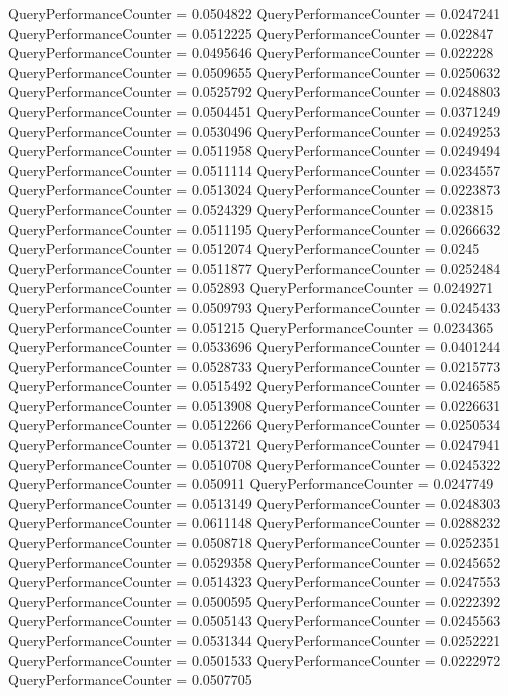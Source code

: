 \documentclass[9pt]{article}
\theoremstyle{plain}
\theoremstyle{definition}
\theoremstyle{remark}
\numberwithin{equation}{section}
\begin{document}
QueryPerformanceCounter  =  0.0504822
QueryPerformanceCounter  =  0.0247241
QueryPerformanceCounter  =  0.0512225
QueryPerformanceCounter  =  0.022847
QueryPerformanceCounter  =  0.0495646
QueryPerformanceCounter  =  0.022228
QueryPerformanceCounter  =  0.0509655
QueryPerformanceCounter  =  0.0250632
QueryPerformanceCounter  =  0.0525792
QueryPerformanceCounter  =  0.0248803
QueryPerformanceCounter  =  0.0504451
QueryPerformanceCounter  =  0.0371249
QueryPerformanceCounter  =  0.0530496
QueryPerformanceCounter  =  0.0249253
QueryPerformanceCounter  =  0.0511958
QueryPerformanceCounter  =  0.0249494
QueryPerformanceCounter  =  0.0511114
QueryPerformanceCounter  =  0.0234557
QueryPerformanceCounter  =  0.0513024
QueryPerformanceCounter  =  0.0223873
QueryPerformanceCounter  =  0.0524329
QueryPerformanceCounter  =  0.023815
QueryPerformanceCounter  =  0.0511195
QueryPerformanceCounter  =  0.0266632
QueryPerformanceCounter  =  0.0512074
QueryPerformanceCounter  =  0.0245
QueryPerformanceCounter  =  0.0511877
QueryPerformanceCounter  =  0.0252484
QueryPerformanceCounter  =  0.052893
QueryPerformanceCounter  =  0.0249271
QueryPerformanceCounter  =  0.0509793
QueryPerformanceCounter  =  0.0245433
QueryPerformanceCounter  =  0.051215
QueryPerformanceCounter  =  0.0234365
QueryPerformanceCounter  =  0.0533696
QueryPerformanceCounter  =  0.0401244
QueryPerformanceCounter  =  0.0528733
QueryPerformanceCounter  =  0.0215773
QueryPerformanceCounter  =  0.0515492
QueryPerformanceCounter  =  0.0246585
QueryPerformanceCounter  =  0.0513908
QueryPerformanceCounter  =  0.0226631
QueryPerformanceCounter  =  0.0512266
QueryPerformanceCounter  =  0.0250534
QueryPerformanceCounter  =  0.0513721
QueryPerformanceCounter  =  0.0247941
QueryPerformanceCounter  =  0.0510708
QueryPerformanceCounter  =  0.0245322
QueryPerformanceCounter  =  0.050911
QueryPerformanceCounter  =  0.0247749
QueryPerformanceCounter  =  0.0513149
QueryPerformanceCounter  =  0.0248303
QueryPerformanceCounter  =  0.0611148
QueryPerformanceCounter  =  0.0288232
QueryPerformanceCounter  =  0.0508718
QueryPerformanceCounter  =  0.0252351
QueryPerformanceCounter  =  0.0529358
QueryPerformanceCounter  =  0.0245652
QueryPerformanceCounter  =  0.0514323
QueryPerformanceCounter  =  0.0247553
QueryPerformanceCounter  =  0.0500595
QueryPerformanceCounter  =  0.0222392
QueryPerformanceCounter  =  0.0505143
QueryPerformanceCounter  =  0.0245563
QueryPerformanceCounter  =  0.0531344
QueryPerformanceCounter  =  0.0252221
QueryPerformanceCounter  =  0.0501533
QueryPerformanceCounter  =  0.0222972
QueryPerformanceCounter  =  0.0507705
\end{document}
